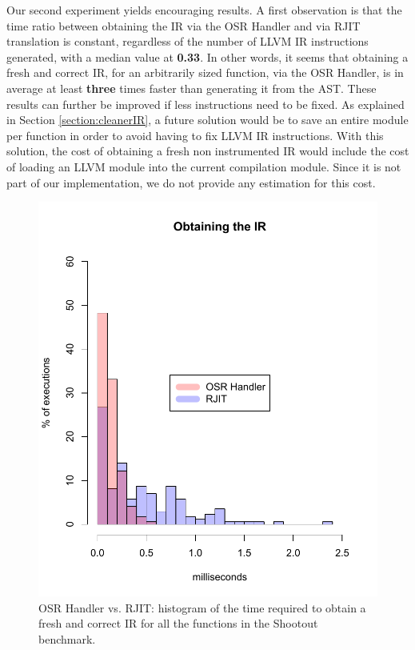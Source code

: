 Our second experiment yields encouraging results.
A first observation is that the time ratio between obtaining the IR via the OSR Handler and via RJIT translation is constant, regardless of the number of LLVM IR instructions generated, with a median value at \textbf{0.33}. 
In other words, it seems that obtaining a fresh and correct IR, for an arbitrarily sized function, via the OSR Handler, is in average at least \textbf{three} times faster than generating it from the AST.
These results can further be improved if less instructions need to be fixed.
As explained in Section \ref{section:cleanerIR}, a future solution would be to save an entire module per function in order to avoid having to fix LLVM IR instructions.
With this solution, the cost of obtaining a fresh non instrumented IR would include the cost of loading an LLVM module into the current compilation module. 
Since it is not part of our implementation, we do not provide any estimation for this cost.\\

\begin{figure}[h]
    \includegraphics[scale=0.9]{Figures/withoutJitAll2}
    \caption{OSR Handler vs. RJIT: histogram of the time required to obtain a fresh and correct IR for all the functions in the Shootout benchmark.}
    \label{fig:withoutJitAll}
\end{figure}

